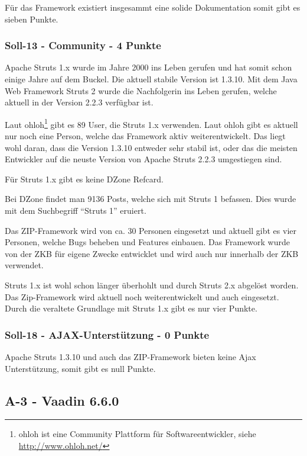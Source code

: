   Für das Framework existiert insgesammt eine solide Dokumentation somit gibt es
  sieben Punkte.
  
  \subsubsection{Soll-13 - Community - 4 Punkte}
  
  Apache Struts 1.x wurde im Jahre 2000 ins Leben gerufen und hat somit schon
  einige Jahre auf dem Buckel. Die aktuell stabile Version ist 1.3.10. Mit dem
  Java Web Framework Struts 2 wurde die Nachfolgerin ins Leben gerufen, welche
  aktuell in der Version 2.2.3 verfügbar ist.
  
  Laut ohloh\footnote{ohloh ist eine Community Plattform für
  Softwareentwickler, siehe \url{http://www.ohloh.net/}} gibt es 89 User, die
  Struts 1.x verwenden. Laut ohloh gibt es aktuell nur noch eine Person, welche
  das Framework aktiv weiterentwickelt. Das liegt wohl daran, dass die Version
  1.3.10 entweder sehr stabil ist, oder das die meisten Entwickler auf die 
  neuste Version von Apache Struts 2.2.3 umgestiegen sind.
  
  Für Struts 1.x gibt es keine DZone Refcard.
  
  Bei DZone findet man 9136 Posts, welche sich mit Struts 1 befassen. Dies wurde
  mit dem Suchbegriff ``Struts 1'' eruiert.
  
  Das ZIP-Framework wird von ca. 30 Personen eingesetzt und aktuell gibt es vier
  Personen, welche Bugs beheben und Features einbauen. Das Framework wurde von
  der \ac{ZKB} für eigene Zwecke entwicklet und wird auch nur innerhalb der
  \ac{ZKB} verwendet.
  
  Struts 1.x ist wohl schon länger überhohlt und durch Struts 2.x abgelöst
  worden. Das Zip-Framework wird aktuell noch weiterentwickelt und auch
  eingesetzt. Durch die veraltete Grundlage mit Struts 1.x gibt es nur vier
  Punkte.

  \subsubsection{Soll-18 - AJAX-Unterstützung - 0 Punkte}
  
  Apache Struts 1.3.10 und auch das ZIP-Framework bieten keine \ac{Ajax}
  Unterstützung, somit gibt es null Punkte.
  
  \subsection{A-3 - Vaadin 6.6.0}
  

